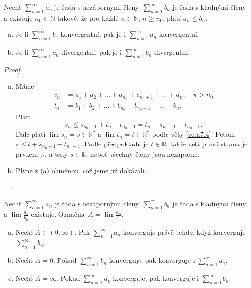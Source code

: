 \begin{veta} \label{veta7.5}
Nechť $\sum_{n=1}^{\infty} a_n$ je řada s nezápornými členy, $\sum_{n=1}^{\infty} b_n$ je řada s kladnými členy a
existuje $n_0 \in \mathbb{N}$ takové, že pro každé $n \in \mathbb{N}$, $n \ge n_0$, platí
$a_n \le b_n$.
\begin{enumerate}[(a)]
\item Je-li $\sum_{n=1}^{\infty} b_n$ konvergentní, pak je i
$\sum_{n=1}^{\infty} a_n$ konvergentní.
\item Je-li $\sum_{n=1}^{\infty} a_n$ divergentní, pak je i
$\sum_{n=1}^{\infty} b_n$ divergentní.
\end{enumerate}
\end{veta}

\begin{proof}\,
\begin{enumerate}[(a)]
	\item Máme
	\begin{align*}
	s_n &= a_1 + a_2 + \dots + a_{n_0} + a_{n_0+1} + \dots + a_n, \quad n > n_0\\
	t_n &= b_1 + b_2 + \dots + b_{n_0} + b_{n_0+1} + \dots + b_n.
\end{align*}
    Platí
    $$
        s_n \leq s_{n_0-1} + t_n - t_{n_0-1} = t_n + s_{n_0-1} - t_{n_0-1}.
    $$
    Dále platí $\lim s_n = s \in \mathbb R ^*$ a $\lim t_n = t \in \mathbb R ^*$ podle věty \ref{veta7.4}.
    Potom $s \leq t + s_{n_0-1} - t_{n_0-1}$. Podle předpokladu je $t \in \mathbb R $, takže
    celá pravá strana je prvkem $\mathbb R $, a tedy $s \in \mathbb R $, neboť všechny členy jsou nezáporné.
    \item Plyne z (a) obměnou, což jsme již dokázali. \qedhere
\end{enumerate}
\end{proof}

\begin{veta} \label{veta7.6}
Nechť $\sum_{n=1}^{\infty} a_n$ je řada s nezápornými členy,
$\sum_{n=1}^{\infty} b_n$ je řada s kladnými členy a
$\lim \frac{a_n}{b_n}$ existuje. Označme
$
A = \lim \frac{a_n}{b_n}.
$
\begin{enumerate}[(a)]
	\item Nechť $A \in (0,\infty)$. Pak $\sum_{n=1}^{\infty} a_n$ konverguje právě tehdy,
když konverguje $\sum_{n=1}^{\infty} b_n$.
\item Nechť $A = 0$. Pokud $\sum_{n=1}^{\infty} b_n$ konverguje,
pak konverguje i $\sum_{n=1}^{\infty} a_n$.
\item Nechť $A = \infty$. Pokud $\sum_{n=1}^{\infty} a_n$ konverguje,
pak konverguje i $\sum_{n=1}^{\infty} b_n$.
\end{enumerate}
\end{veta}

